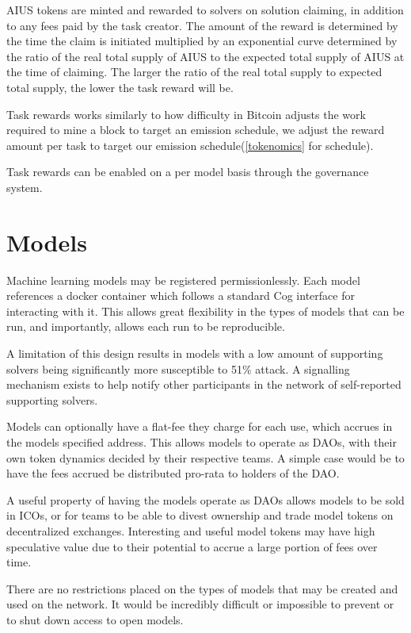 \documentclass{article}
\begin{document}
AIUS tokens are minted and rewarded to solvers on solution claiming, in addition to any fees paid by the task creator. The amount of the reward is determined by the time the claim is initiated multiplied by an exponential curve determined by the ratio of the real total supply of AIUS to the expected total supply of AIUS at the time of claiming. The larger the ratio of the real total supply to expected total supply, the lower the task reward will be.

Task rewards works similarly to how difficulty in Bitcoin \cite{bitcoin} adjusts the work required to mine a block to target an emission schedule, we adjust the reward amount per task to target our emission schedule(\ref{tokenomics} for schedule).

Task rewards can be enabled on a per model basis through the governance system.

\section{Models}

Machine learning models may be registered permissionlessly. Each model references a docker container which follows a standard Cog \cite{cog} interface for interacting with it. This allows great flexibility in the types of models that can be run, and importantly, allows each run to be reproducible.

A limitation of this design results in models with a low amount of supporting solvers being significantly more susceptible to 51\% attack. A signalling mechanism exists to help notify other participants in the network of self-reported supporting solvers.

Models can optionally have a flat-fee they charge for each use, which accrues in the models specified address. This allows models to operate as DAOs, with their own token dynamics decided by their respective teams. A simple case would be to have the fees accrued be distributed pro-rata to holders of the DAO.

A useful property of having the models operate as DAOs allows models to be sold in ICOs, or for teams to be able to divest ownership and trade model tokens on decentralized exchanges. Interesting and useful model tokens may have high speculative value due to their potential to accrue a large portion of fees over time.

There are no restrictions placed on the types of models that may be created and used on the network. It would be incredibly difficult or impossible to prevent or to shut down access to open models.
\end{document}
